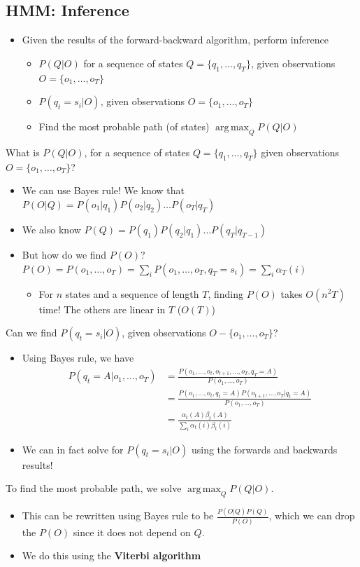 \documentclass[10pt]{article}
\DeclareMathOperator*{\argmax}{arg\,max}
\begin{document}
\subsection*{HMM: Inference}
\begin{itemize}
	\item Given the results of the forward-backward algorithm, perform inference
	\begin{itemize}
	    \item $P(Q | O)$ for a sequence of states $Q = \{q_1, \dots, q_T\}$, given observations $O = \{o_1, \dots, o_T\}$
	    \item $P(q_t = s_i | O)$, given observations $O = \{o_1, \dots, o_T\}$
	    \item Find the most probable path (of states) $\argmax_Q P(Q | O)$
    \end{itemize}
\end{itemize}
What is $P(Q | O)$, for a sequence of states $Q = \{q_1, \dots, q_T\}$ given observations $O = \{o_1, \dots, o_T\}$?
\begin{itemize}
	\item We can use Bayes rule!  We know that $P(O | Q) = P(o_1 | q_1) P(o_2 | q_2) \dots P(o_T | q_T)$
	\item We also know $P(Q) = P(q_1) P(q_2 | q_1) \dots P(q_T | q_{T - 1})$
	\item But how do we find $P(O)$?  $P(O) = P(o_1, \dots, o_T) = \sum_i P(o_1, \dots, o_T, q_T = s_i) = \sum_i \alpha_T (i)$
	\begin{itemize}
	    \item For $n$ states and a sequence of length $T$, finding $P(O)$ takes $O(n^2 T)$ time!  The others are linear in $T$ ($O(T)$)
    \end{itemize}
\end{itemize}
Can we find $P(q_t = s_i | O)$, given observations $O - \{o_1, \dots, o_T\}$?
\begin{itemize}
	\item Using Bayes rule, we have
	\begin{align*}
    P(q_t = A | o_1, \dots, o_T) &= \frac{P(o_1, \dots, o_t, o_{t + 1}, \dots, o_T, q_T = A)}{P(o_1, \dots, o_T)} \\
    &= \frac{P(o_1, \dots, o_t, q_t = A) P(o_{t + 1}, \dots, o_T | q_t = A)}{P(o_1, \dots, o_T)} \\
    &= \frac{\alpha_t(A) \beta_t (A)}{\sum_i \alpha_t(i) \beta_t(i)}
    \end{align*}
    \item We can in fact solve for $P(q_t = s_i | O)$ using the forwards and backwards results!
\end{itemize}
To find the most probable path, we solve $\argmax_Q P(Q | O)$.
\begin{itemize}
	\item This can be rewritten using Bayes rule to be $\frac{P(O | Q) P(Q)}{P(O)}$, which we can drop the $P(O)$ since it does not depend on $Q$.
	\item We do this using the \textbf{Viterbi algorithm}
\end{itemize}
\end{document}
